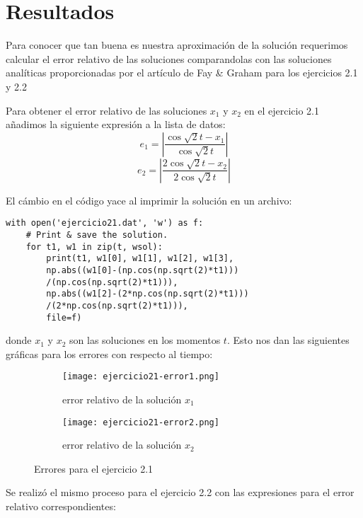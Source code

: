 \documentclass{article}
\begin{document}
\newpage

\section{Resultados}

Para conocer que tan buena es nuestra aproximación de la solución requerimos calcular el error relativo de las soluciones comparandolas con las soluciones analíticas proporcionadas por el artículo de Fay \& Graham para los ejercicios 2.1 y 2.2

Para obtener el error relativo de las soluciones $x_1$ y $x_2$ en el ejercicio 2.1 añadimos la siguiente expresión a la lista de datos:
\[ e_1=\left|\frac{\cos\sqrt{2}t-x_1}{\cos\sqrt{2}t}\right| \]
\[ e_2=\left|\frac{2\cos\sqrt{2}t-x_2}{2\cos\sqrt{2}t}\right| \]

El cámbio en el código yace al imprimir la solución en un archivo:

\begin{framed}
\begin{verbatim}
with open('ejercicio21.dat', 'w') as f:
    # Print & save the solution.
    for t1, w1 in zip(t, wsol):
        print(t1, w1[0], w1[1], w1[2], w1[3],
        np.abs((w1[0]-(np.cos(np.sqrt(2)*t1)))
        /(np.cos(np.sqrt(2)*t1))),
        np.abs((w1[2]-(2*np.cos(np.sqrt(2)*t1)))
        /(2*np.cos(np.sqrt(2)*t1))),
        file=f)
\end{verbatim}
\end{framed} 

donde $x_1$ y $x_2$ son las soluciones en los momentos $t$. Esto nos dan las siguientes gráficas para los errores con respecto al tiempo:

\begin{figure}[h!]
	\begin{subfigure}[b]{0.5\linewidth}
    \raggedleft
	\texttt{[image: ejercicio21-error1.png]}
    \caption{error relativo de la solución $x_1$}
	\end{subfigure}
	\begin{subfigure}[b]{0.5\linewidth}
    \raggedright
	\texttt{[image: ejercicio21-error2.png]}
	\caption{error relativo de la solución $x_2$}
    \end{subfigure}
    \caption{Errores para el ejercicio 2.1}
\end{figure}

Se realizó el mismo proceso para el ejercicio 2.2 con las expresiones para el error relativo correspondientes:
\end{document}
